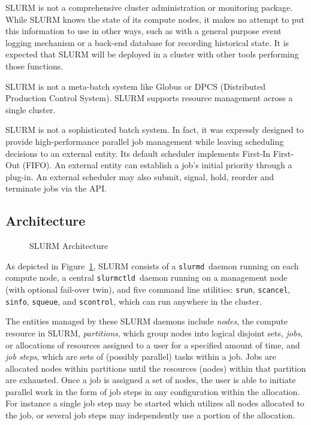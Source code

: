 \documentclass{article}
\newcommand{\slurmctld}{{\tt slurmctld}}
\newcommand{\slurmd}{{\tt slurmd}}
\begin{document}
SLURM is not a comprehensive cluster administration or monitoring package.  
While SLURM knows the state of its compute nodes, it makes no attempt to put
this information to use in other ways, such as with a general purpose event
logging mechanism or a back-end database for recording historical state.
It is expected that SLURM will be deployed in a cluster with other 
tools performing those functions. 

SLURM is not a meta-batch system like Globus\cite{Globus2002}
or DPCS (Distributed Production Control System)\cite{DPCS2002}.  
SLURM supports resource management across a single cluster.

SLURM is not a sophisticated batch system.  
In fact, it was expressly designed to provide high-performance 
parallel job management while leaving scheduling decisions to an 
external entity. 
Its default scheduler implements First-In First-Out (FIFO). 
An external entity can establish a job's initial priority 
through a plug-in.
An external scheduler may also submit, signal, hold, reorder and 
terminate jobs via the API.


\subsection{Architecture}

\begin{figure}[tb]
\centerline{}
\caption{SLURM Architecture}
\label{arch}
\end{figure}

As depicted in Figure~\ref{arch}, SLURM consists of a \slurmd\ daemon
running on each compute node, a central \slurmctld\ daemon running on
a management node (with optional fail-over twin), and five command line
utilities: {\tt srun}, {\tt scancel}, {\tt sinfo}, {\tt squeue}, and 
{\tt scontrol}, which can run anywhere in the cluster.  

The entities managed by these SLURM daemons include {\em nodes}, the
compute resource in SLURM, {\em partitions}, which group nodes into
logical disjoint sets, {\em jobs}, or allocations of resources assigned
to a user for a specified amount of time, and {\em job steps}, which are
sets of (possibly parallel) tasks within a job.  
Jobs are allocated nodes within 
partitions until the resources (nodes) within that partition are exhausted. 
Once a job is assigned a set of nodes, the user is able to initiate
parallel work in the form of job steps in any configuration within the
allocation. For instance a single job step may be started which utilizes
all nodes allocated to the job, or several job steps may independently 
use a portion of the allocation.
\end{document}
